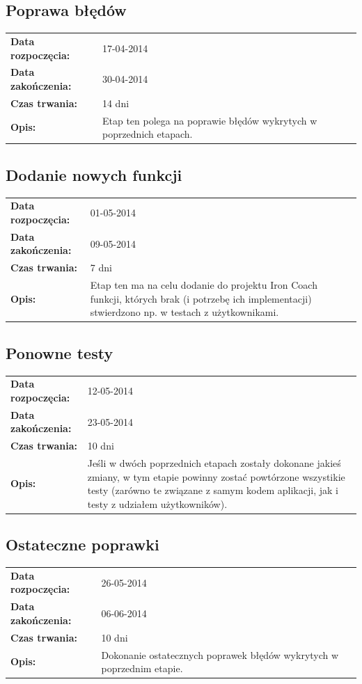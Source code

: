 \subsection{Poprawa błędów}
	\begin{tabular}{l p{5cm}}
		\textbf{Data rozpoczęcia:} & 17-04-2014\\
		\textbf{Data zakończenia:} & 30-04-2014\\
		\textbf{Czas trwania:} & 14 dni\\
		\textbf{Opis:} & Etap ten polega na poprawie błędów wykrytych w poprzednich etapach. 
	\end{tabular}
\subsection{Dodanie nowych funkcji}
	\begin{tabular}{l p{5cm}}
		\textbf{Data rozpoczęcia:} & 01-05-2014\\
		\textbf{Data zakończenia:} & 09-05-2014\\
		\textbf{Czas trwania:} & 7 dni\\
		\textbf{Opis:} & Etap ten ma na celu dodanie do projektu Iron Coach funkcji, których brak (i potrzebę ich implementacji) stwierdzono np. w testach z użytkownikami.
	\end{tabular}
\subsection{Ponowne testy}
	\begin{tabular}{l p{5cm}}
		\textbf{Data rozpoczęcia:} & 12-05-2014\\
		\textbf{Data zakończenia:} & 23-05-2014\\
		\textbf{Czas trwania:} & 10 dni\\
		\textbf{Opis:} & Jeśli w dwóch poprzednich etapach zostały dokonane jakieś zmiany, w tym etapie powinny zostać powtórzone wszystikie testy (zarówno te związane z samym kodem aplikacji, jak i testy z udziałem użytkowników).
	\end{tabular}
\subsection{Ostateczne poprawki}
	\begin{tabular}{l p{5cm}}
		\textbf{Data rozpoczęcia:} & 26-05-2014\\
		\textbf{Data zakończenia:} & 06-06-2014\\
		\textbf{Czas trwania:} & 10 dni\\
		\textbf{Opis:} & Dokonanie ostatecznych poprawek błędów wykrytych w poprzednim etapie.
	\end{tabular}

